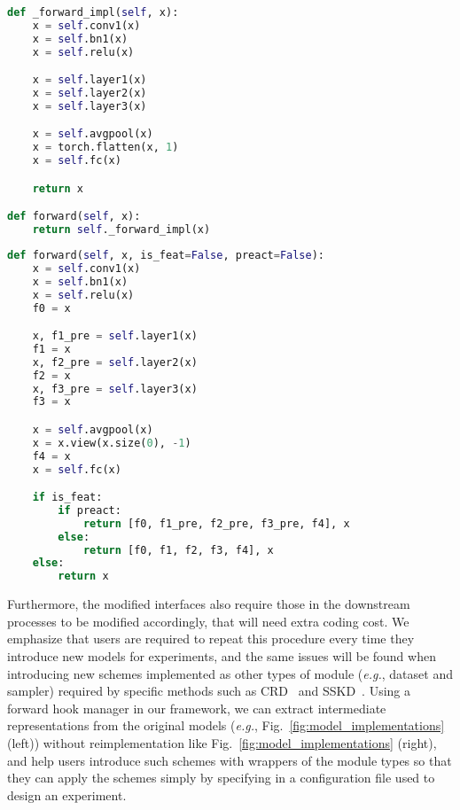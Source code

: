 \documentclass[runningheads]{llncs}
\begin{document}
\begin{figure*}[t]
\centering
\noindent\begin{minipage}[t]{0.4\linewidth}
\begin{lstlisting}[language=Python, backgroundcolor=\color{MintCream}, basicstyle=\scriptsize, columns=fullflexible]
def _forward_impl(self, x):
    x = self.conv1(x)
    x = self.bn1(x)
    x = self.relu(x)

    x = self.layer1(x)
    x = self.layer2(x)
    x = self.layer3(x)

    x = self.avgpool(x)
    x = torch.flatten(x, 1)
    x = self.fc(x)

    return x

def forward(self, x):
    return self._forward_impl(x)
\end{lstlisting}
\end{minipage}\hfill
\begin{minipage}[t]{0.55\linewidth}
\begin{lstlisting}[language=Python, backgroundcolor=\color{MintCream}, basicstyle=\scriptsize, columns=fullflexible]
def forward(self, x, is_feat=False, preact=False):
    x = self.conv1(x)
    x = self.bn1(x)
    x = self.relu(x)
    f0 = x

    x, f1_pre = self.layer1(x)
    f1 = x
    x, f2_pre = self.layer2(x)
    f2 = x
    x, f3_pre = self.layer3(x)
    f3 = x

    x = self.avgpool(x)
    x = x.view(x.size(0), -1)
    f4 = x
    x = self.fc(x)

    if is_feat:
        if preact:
            return [f0, f1_pre, f2_pre, f3_pre, f4], x
        else:
            return [f0, f1, f2, f3, f4], x
    else:
        return x
\end{lstlisting}
\end{minipage}
\vspace{-1em}
\caption{Forward functions in \uline{\bf original (left, torchvision-style)} and \uline{\bf hard-coded (right, \cite{tian2020contrastive,xu2020knowledge})} implementations of ResNet. Only ``x'' from ``self.fc'' is used for vanilla training and prediction.}
\label{fig:model_implementations}
\end{figure*}


Furthermore, the modified interfaces also require those in the downstream processes to be modified accordingly, that will need extra coding cost.
We emphasize that users are required to repeat this procedure every time they introduce new models for experiments, and the same issues will be found when introducing new schemes implemented as other types of module (\emph{e.g.}, dataset and sampler) required by specific methods such as CRD~\cite{tian2020contrastive} and SSKD~\cite{xu2020knowledge}.
Using a forward hook manager in our framework, we can extract intermediate representations from the original models (\emph{e.g.}, Fig.~\ref{fig:model_implementations} (left)) without reimplementation like Fig.~\ref{fig:model_implementations} (right), and help users introduce such schemes with wrappers of the module types so that they can apply the schemes simply by specifying in a configuration file used to design an experiment.
\end{document}
